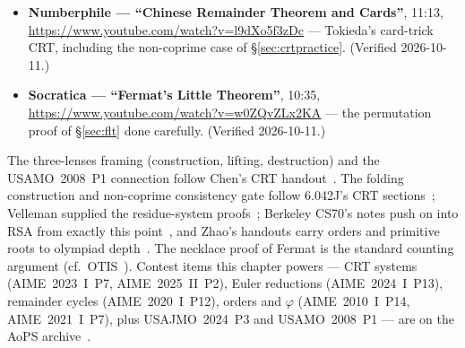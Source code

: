 \begin{rulebox}
\begin{itemize}
\item \textbf{Numberphile --- ``Chinese Remainder Theorem and Cards''},
11:13, \url{https://www.youtube.com/watch?v=l9dXo5f3zDc} --- Tokieda's
card-trick CRT, including the non-coprime case of \S\ref{sec:crtpractice}.
(Verified 2026-10-11.)
\item \textbf{Socratica --- ``Fermat's Little Theorem''}, 10:35,
\url{https://www.youtube.com/watch?v=w0ZQvZLx2KA} --- the permutation
proof of \S\ref{sec:flt} done carefully. (Verified 2026-10-11.)
\end{itemize}
\end{rulebox}

\chapternotes
The three-lenses framing (construction, lifting, destruction) and the
USAMO~2008~P1 connection follow Chen's CRT handout~\cite{chen-crt}. The
folding construction and non-coprime consistency gate follow 6.042J's
CRT sections~\cite{mcs}; Velleman supplied the residue-system
proofs~\cite{velleman}; Berkeley CS70's notes push on into RSA from
exactly this point~\cite{cs70}, and Zhao's handouts carry orders and
primitive roots to olympiad depth~\cite{zhao}. The necklace proof of
Fermat is the standard counting argument (cf.\ OTIS~\cite{otis}).
Contest items this chapter powers --- CRT systems (AIME~2023~I~P7,
AIME~2025~II~P2), Euler reductions (AIME~2024~I~P13), remainder cycles
(AIME~2020~I~P12), orders and $\varphi$ (AIME~2010~I~P14,
AIME~2021~I~P7), plus USAJMO~2024~P3 and USAMO~2008~P1 --- are on the
AoPS archive~\cite{aops-amc}.

